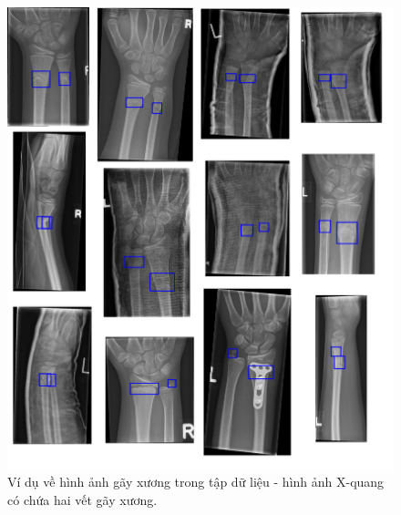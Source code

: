 \documentclass[../the.tex]{subfiles}
\begin{document}
\begin{figure}[H]
\centering
	\includegraphics[width=1\textwidth]{images/dataset_2.png}
	\caption{Ví dụ về hình ảnh gãy xương trong tập dữ liệu - hình ảnh X-quang có chứa hai vết gãy xương.}
	\label{fig:dataset_2}
\end{figure}
\end{document}
